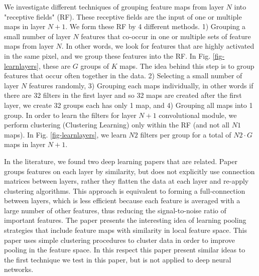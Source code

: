 \documentclass{article} %
\begin{document}
We investigate different techniques of grouping feature maps from layer $N$ into "receptive fields" (RF). These receptive fields are the input of one or multiple maps in layer $N+1$. We form these RF by 4 different methods. 1) Grouping a small number of layer $N$ features that co-occur in one or multiple sets of feature maps from layer $N$. In other words, we look for features that are highly activated in the same pixel, and we group these features into the RF. In Fig. \ref{fig-learnlayers}, these are $G$ groups of $K$ maps. The idea behind this step is to group features that occur often together in the data. 2) Selecting a small number of layer $N$ features randomly, 3) Grouping each maps individually, in other words if there are 32 filters in the first layer and so 32 maps are created after the first layer, we create 32 groups each has only 1 map, and 4) Grouping all maps into 1 group. 
In order to learn the filters for layer $N+1$ convolutional module, we perform clustering (Clustering Learning) only within the RF (and not all $N1$ maps). In Fig. \ref{fig-learnlayers}, we learn $N2$ filters per group for a total of $N2 \cdot G$ maps in layer $N+1$.


In the literature, we found two deep learning papers that are related. 
Paper \cite{coates2012learning} groups features on each layer by similarity, but does not explicitly use connection matrices between layers, rather they flatten the data at each layer and re-apply clustering algorithms. This approach is equivalent to forming a full-connection between layers, which is less efficient because each feature is averaged with a large number of other features, thus reducing the signal-to-noise ratio of important features. 
The paper \cite{boureau_2011} presents the interesting idea of learning pooling strategies that include feature maps with similarity in local feature space. This paper uses simple clustering procedures to cluster data in order to improve pooling in the feature space. In this respect this paper present similar ideas to the first technique we test in this paper, but is not applied to deep neural networks.
\end{document}
